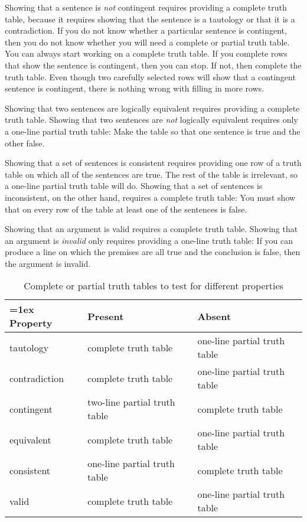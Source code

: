 Showing that a sentence is \emph{not} contingent requires providing a complete truth table, because it requires showing that the sentence is a tautology or that it is a contradiction.  If you do not know whether a particular sentence is contingent, then you do not know whether you will need a complete or partial truth table. You can always start working on a complete truth table. If you complete rows that show the sentence is contingent, then you can stop. If not, then complete the truth table. Even though two carefully selected rows will show that a contingent sentence is contingent, there is nothing wrong with filling in more rows.

Showing that two sentences are logically equivalent requires providing a complete truth table. Showing that two sentences are \emph{not} logically equivalent requires only a one-line partial truth table: Make the table so that one sentence is true and the other false.

Showing that a set of sentences is consistent requires providing one row of a truth table on which all of the sentences are true. The rest of the table is irrelevant, so a one-line partial truth table will do. Showing that a set of sentences is inconsistent, on the other hand, requires a complete truth table: You must show that on every row of the table at least one of the sentences is false.

Showing that an argument is valid requires a complete truth table. Showing that an argument is \emph{invalid} only requires providing a one-line truth table: If you can produce a line on which the premises are all true and the conclusion is false, then the argument is invalid.

\begin{table}
\begin{center}
\begin{tabu}{X[.5,c,m] ||X[1,l,m] |X[1,l,m]}
\tabulinesep=1ex
Property  & Present & Absent\\ \hline \hline
tautology & complete truth table & one-line partial truth table\\ \hline
contradiction &  complete truth table  & one-line partial truth table\\ \hline
contingent & two-line partial truth table & complete truth table\\ \hline
equivalent & complete truth table & one-line partial truth table\\ \hline
consistent & one-line partial truth table & complete truth table\\ \hline
valid & complete truth table & one-line partial truth table\\ 
\end{tabu}
\end{center}
\caption{Complete or partial truth tables to test for different properties}
\label{table.CompleteVsPartial}
\end{table}

